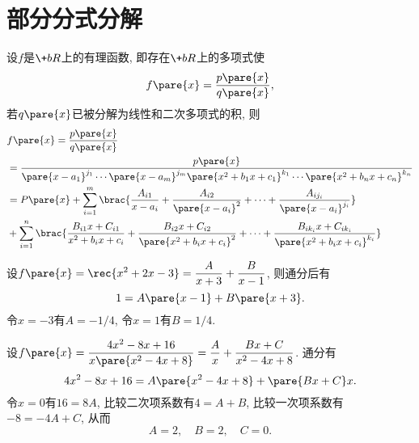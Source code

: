 \documentclass{ctexart}
\begin{document}
\section{部分分式分解} %
\label{sec:部分分式分解}

设$f$是$\+bR$上的有理函数, 即存在$\+bR$上的多项式使
\[ f\pare{x} = \frac{p\pare{x}}{q\pare{x}}, \]
若$q\pare{x}$已被分解为线性和二次多项式的积, 则
\begin{align*}
    & f\pare{x} = \frac{p\pare{x}}{q\pare{x}} \\
    &= \frac{p\pare{x}}{\pare{x-a_1}^{j_1}\cdots\pare{x-a_m}^{j_m}\pare{x^2+b_1x+c_1}^{k_1}\cdots\pare{x^2+b_n x+c_n}^{k_n}} \\
    &= P\pare{x} + \sum_{i=1}^m \brac{\frac{A_{i1}}{x-a_i} + \frac{A_{i2}}{\pare{x-a_i}^2} + \cdots + \frac{A_{ij_i}}{\pare{x-a_i}^{j_i}}} \\
    &+ \sum_{i=1}^n \brac{\frac{B_{i1}x + C_{i1}}{x^2 + b_i x + c_i} + \frac{B_{i2}x + C_{i2}}{\pare{x^2 + b_i x + c_i}^2} + \cdots + \frac{B_{ik_i}x + C_{ik_i}}{\pare{x^2 + b_i x + c_i}^{k_i}}}
\end{align*}
\begin{sample}
    \begin{ex}
        设$\displaystyle f\pare{x} = \rec{x^2+2x-3} = \frac{A}{x+3} + \frac{B}{x-1}$, 则通分后有
        \[ 1 = A\pare{x-1} + B\pare{x+3}. \]
        令$x=-3$有$A = -1/4$, 令$x=1$有$B=1/4$.
    \end{ex}
\end{sample}
\begin{sample}
    \begin{ex}
        设$\displaystyle f\pare{x} = \frac{4x^2 - 8x + 16}{x\pare{x^2-4x+8}} = \frac{A}{x} + \frac{Bx+C}{x^2 - 4x + 8}$. 通分有
        \[ 4x^2 - 8x + 16 = A\pare{x^2 - 4x + 8} + \pare{Bx+C}x. \]
        令$x = 0$有$16 = 8A$, 比较二次项系数有$4 = A+B$, 比较一次项系数有$-8 = -4A+C$, 从而
        \[ A=2,\quad B=2,\quad C=0. \]
    \end{ex}
\end{sample}
\end{document}
